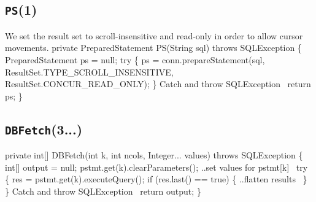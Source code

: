 \documentclass{article}
\def\nwendcode{\endtrivlist \endgroup}
\theoremstyle{definition}
\begin{document}
\subsection{{\tt{}\protect{}PS}(1)}
We set the result set to scroll-insensitive and read-only in order to allow
cursor movements.
\nwenddocs{}\endmoddef{}
private PreparedStatement PS(String sql) throws SQLException \{
  PreparedStatement ps = null;
  try \{
    ps = conn.prepareStatement(sql,
      ResultSet.TYPE_SCROLL_INSENSITIVE, ResultSet.CONCUR_READ_ONLY);
  \}
  \LA{}Catch and throw \code{}SQLException\edoc{}~{\nwtagstyle{}}\RA{}
  return ps;
\}
\eatline
{}\nwendcode{}\subsection{{\tt{}\protect{}DBFetch}(3...)}
\label{sec:fetch}
\nwenddocs{}\endmoddef{}
private int[] DBFetch(int k, int ncols, Integer... values) throws SQLException \{
  int[] output = null;
  pstmt.get(k).clearParameters();
  \LA{}..set values for \code{}pstmt[k]\edoc{}~{\nwtagstyle{}}\RA{}
  try \{
    res = pstmt.get(k).executeQuery();
    if (res.last() == true) \{
      \LA{}..flatten results~{\nwtagstyle{}}\RA{}
    \}
  \}
  \LA{}Catch and throw \code{}SQLException\edoc{}~{\nwtagstyle{}}\RA{}
  return output;
\}
\eatline
{}\nwendcode{}\endmoddef{}
\end{document}

